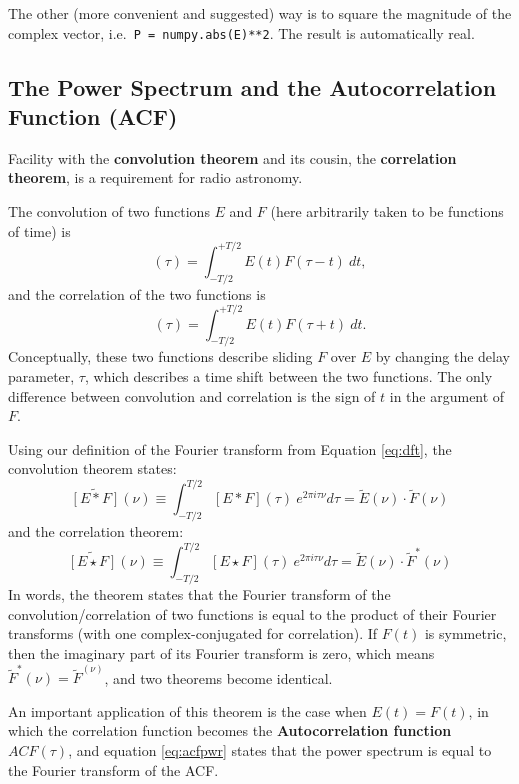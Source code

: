 \documentclass[11pt,preprint]{aastex}
\begin{document}
The other (more convenient and suggested) way is to square the magnitude of
the complex vector, i.e.\ \verb$P = numpy.abs(E)**2$. The result is
automatically real.


\subsection{The Power Spectrum and the Autocorrelation Function
  (ACF)} \label{acf}

\noindent
Facility with the {\bf convolution theorem} and its cousin,
the {\bf correlation theorem}, 
is a requirement for radio astronomy. 

The convolution of two functions $E$ and $F$ (here arbitrarily taken
to be functions of time) is
%
\begin{equation}
[E * F](\tau) = \int_{-T/2}^{+T/2} E(t) F(\tau - t) \ dt,
\end{equation}
%
and the correlation of the two functions is
%
\begin{equation}
[E\star F](\tau) = \int_{-T/2}^{+T/2} E(t) F(\tau + t) \ dt.
\end{equation}
%
\noindent Conceptually, these two functions describe sliding $F$ over
$E$ by changing the delay parameter, $\tau$, which describes a
time shift between the two functions.
The only difference between convolution and correlation is the sign of $t$ in the argument of
$F$.

Using our definition of the Fourier transform from
Equation \ref{eq:dft}, the convolution theorem states:
%
\begin{equation}
\widetilde{[E*F]}(\nu)\equiv\int_{-T/2}^{T/2} [E*F](\tau)~e^{2\pi i \tau\nu} d\tau =
    \tilde E(\nu) \cdot \tilde F(\nu)
\end{equation}
%
and the correlation theorem:
\begin{equation}
\widetilde{[E\star F]}(\nu)\equiv\int_{-T/2}^{T/2} [E\star F](\tau)~e^{2\pi i \tau\nu} d\tau =
    \tilde E(\nu) \cdot \tilde F^*(\nu)
\label{eq:acfpwr}
\end{equation}
%
In words, the theorem states that the Fourier transform of
  the convolution/correlation of two functions is equal to the product of their
  Fourier transforms (with one complex-conjugated for correlation).
If $F(t)$ is
symmetric, then the imaginary part of its Fourier transform is zero,
which means $\tilde F^*(\nu) = \tilde F^(\nu)$, and two theorems become
identical.

An important application of this theorem is the case when
$E(t)=F(t)$, in which the correlation function becomes the {\bf
  Autocorrelation function} $ACF(\tau)$, and equation \ref{eq:acfpwr}
states that the power spectrum is equal to the Fourier
  transform of the ACF.
\end{document}

